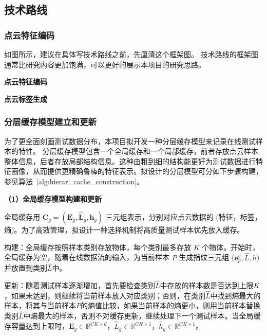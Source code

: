 \documentclass[12pt]{article}
\newcommand{\myEmph}[1]{\textbf{\textcolor[rgb]{0,0,0.25}{#1}}}
\begin{document}
\subsection{技术路线}

\subsubsection{点云特征编码}
如图所示，建议在具体写技术路线之前，先厘清这个框架图。
技术路线的框架图通常比研究内容更加饱满，可以更好的展示本项目的研究思路。


\myEmph{点云特征编码}

\myEmph{点云标签生成}

\subsubsection{分层缓存模型建立和更新}

为了更全面刻画测试数据分布，本项目拟开发一种分层缓存模型来记录在线测试样本的特性。
分层缓存模型包含一个全局缓存和一个局部缓存，前者存放点云样本整体信息，后者存放局部结构信息。这种由粗到细的结构能更好为测试数据进行特征画像，从而提供更精确鲁棒的特征表示。拟设计的分层模型可分如下步骤构建，参见算法~\ref{alg:hierar_cache_construction}。

\myEmph{（1）全局缓存模型构建和更新}

全局缓存用 $\textbf{C}_g = (\textbf{E}_g, \hat{\textbf{L}}_g, \textbf{h}_g)$ 三元组表示，分别对应点云数据的 (特征，标签，熵)。为了高效管理，拟设计一种选择机制将高质量测试样本优先放入缓存。

构建：全局缓存按照样本类别存放物体，每个类别最多存放 $K$ 个物体。开始时，全局缓存为空，随着在线数据流的输入，为当前样本 $P$ 生成指纹三元组 ($\textbf{e}_p^g, \hat{L}, h$)并放置到类别$\hat{L}$中。

更新：随着测试样本逐渐增加，首先要检查类别$\hat{L}$中存放的样本数是否达到上限$K$，如果未达到，则继续将当前样本放入对应类别；否则，在类别$\hat{L}$中找到熵最大的样本，将其与当前样本$P$的熵值比较，如果当前样本的熵更小，则用当前样本替换类别$\hat{L}$中熵最大的样本，否则不对缓存更新，继续处理下一个测试样本。当全局缓存容量达到上限时，$\textbf{E}_g \in \mathbb{R}^{CK\times d}$，$\hat{L}_g \in \mathbb{R}^{CK \times 1}$，$\hat{h}_g \in \mathbb{R}^{CK \times 1}$。
\end{document}
